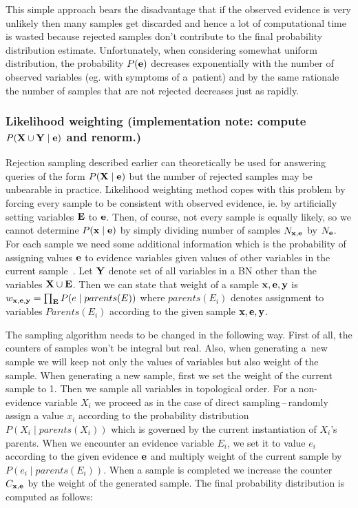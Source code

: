 \documentclass[english,cover]{fitthesis} %
\newcommand{\vars}[1]{{\bold{#1}}}         %
\newcommand{\todo}[1]{{\color{red}#1}}
\begin{document}
This simple approach bears the disadvantage that if the observed evidence is very unlikely then many samples get discarded and hence a lot of computational time is wasted because rejected samples don't contribute to the final probability distribution estimate. Unfortunately, when considering somewhat uniform distribution, the probability $P(\vars{e})$ decreases exponentially with the number of observed variables (eg. with symptoms of a~patient) and by the same rationale the number of samples that are not rejected decreases just as rapidly.

\subsubsection{Likelihood weighting (\todo{implementation note: compute $P(\vars{X}\cup\vars{Y}\mid\vars{e})$ and renorm.})}
Rejection sampling described earlier can theoretically be used for answering queries of the form $P(\vars{X} \mid \vars{e})$ but the number of rejected samples may be unbearable in practice. Likelihood weighting method copes with this problem by forcing every sample to be consistent with observed evidence, ie. by artificially setting variables $\vars{E}$ to $\vars{e}$. Then, of course, not every sample is equally likely, so we cannot determine $P(\vars{x} \mid \vars{e})$ by simply dividing number of samples $N_{\vars{x},\vars{e}}$ by $N_\vars{e}$. For each sample we need some additional information which is the probability of assigning values $\vars{e}$ to evidence variables given values of other variables in the current sample~\cite[p.~514]{russell_norvig_ed2}. Let $\vars{Y}$ denote set of all variables in a BN other than the variables $\vars{X} \cup \vars{E}$. Then we can state that weight of a sample $\vars{x},\vars{e}, \vars{y}$ is $w_{\vars{x},\vars{e}, \vars{y}} = \prod_\vars{E} P(e \mid parents(E))$ where $parents(E_i)$ denotes assignment to variables $Parents(E_i)$ according to the given sample $\vars{x},\vars{e}, \vars{y}$.

The sampling algorithm needs to be changed in the following way. First of all, the counters of samples won't be integral but real. Also, when generating a~new sample we will keep not only the values of variables but also weight of the sample. When generating a new sample, first we set the weight of the current sample to 1. Then we sample all variables in topological order. For a non-evidence variable $X_i$ we proceed as in the case of direct sampling\,--\,randomly assign a value $x_i$ according to the probability distribution $P(X_i \mid parents(X_i))$ which is governed by the current instantiation of $X_i$'s parents. When we encounter an evidence variable $E_i$, we set it to value $e_i$ according to the given evidence $\vars{e}$ and multiply weight of the current sample by $P(e_i \mid parents(E_i))$. When a sample is completed we increase the counter $C_{\vars{x},\vars{e}}$ by the weight of the generated sample. The final probability distribution is computed as follows:
\end{document}
